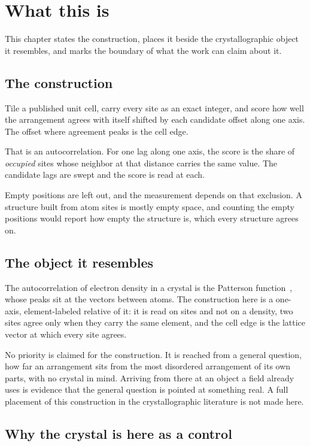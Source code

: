 \chapter{What this is}

This chapter states the construction, places it beside the crystallographic object it resembles, and marks the boundary of what the work can claim about it.

\section{The construction}

Tile a published unit cell, carry every site as an exact integer, and score how well the arrangement agrees with itself shifted by each candidate offset along one axis. The offset where agreement peaks is the cell edge.

That is an autocorrelation. For one lag along one axis, the score is the share of \emph{occupied} sites whose neighbor at that distance carries the same value. The candidate lags are swept and the score is read at each.

Empty positions are left out, and the measurement depends on that exclusion. A structure built from atom sites is mostly empty space, and counting the empty positions would report how empty the structure is, which every structure agrees on.

\section{The object it resembles}

The autocorrelation of electron density in a crystal is the Patterson function~\cite{src:Patterson-1934}, whose peaks sit at the vectors between atoms. The construction here is a one-axis, element-labeled relative of it: it is read on sites and not on a density, two sites agree only when they carry the same element, and the cell edge is the lattice vector at which every site agrees.

No priority is claimed for the construction. It is reached from a general question, how far an arrangement sits from the most disordered arrangement of its own parts, with no crystal in mind. Arriving from there at an object a field already uses is evidence that the general question is pointed at something real. A full placement of this construction in the crystallographic literature is not made here.

\section{Why the crystal is here as a control}


